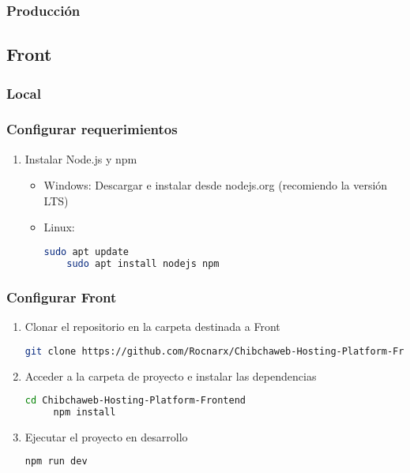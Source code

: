 \subsubsection{Producción}

\subsection{Front}

\subsubsection{Local}
\subsubsection*{Configurar requerimientos}
\begin{enumerate}
    \item Instalar Node.js y npm
    \begin{itemize}
        \item Windows: Descargar e instalar desde nodejs.org (recomiendo la versión LTS)
        \item Linux:
        \begin{lstlisting}[language=bash]
    sudo apt update
    sudo apt install nodejs npm
        \end{lstlisting}
    \end{itemize}
\end{enumerate}

\subsubsection*{Configurar Front}

\begin{enumerate}
    \item Clonar el repositorio en la carpeta destinada a Front
    \begin{lstlisting}[language=bash]
git clone https://github.com/Rocnarx/Chibchaweb-Hosting-Platform-Frontend.git
    \end{lstlisting}
     \item Acceder a la carpeta de proyecto e instalar las dependencias
     \begin{lstlisting}[language=bash]
     cd Chibchaweb-Hosting-Platform-Frontend
     npm install
     \end{lstlisting}
     \item Ejecutar el proyecto en desarrollo
     \begin{lstlisting}[language=bash]
     npm run dev
     \end{lstlisting}
\end{enumerate}
